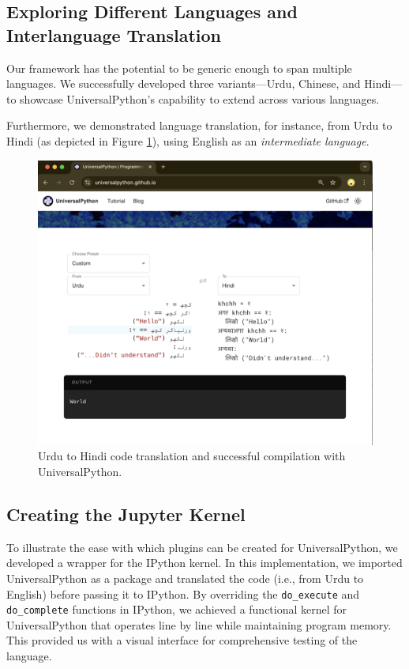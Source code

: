 \documentclass[conference]{IEEEtran}
\begin{document}
\subsection{Exploring Different Languages and Interlanguage Translation}

Our framework has the potential to be generic enough to span multiple languages. We successfully developed three variants—Urdu, Chinese, and Hindi—to showcase UniversalPython's capability to extend across various languages.

Furthermore, we demonstrated language translation, for instance, from Urdu to Hindi (as depicted in Figure \ref{fig:language-to-language}), using English as an \textit{intermediate language}.
\begin{figure}[htbp]
\centerline{\includegraphics[width=\columnwidth]{UniversalPython-language-to-language.png}}
\caption{Urdu to Hindi code translation and successful compilation with UniversalPython.}
\label{fig:language-to-language}
\end{figure}


\subsection{Creating the Jupyter Kernel}

To illustrate the ease with which plugins can be created for UniversalPython, we developed a wrapper for the IPython kernel. In this implementation, we imported UniversalPython as a package and translated the code (i.e., from Urdu to English) before passing it to IPython. By overriding the \verb|do_execute| and \verb|do_complete| functions in IPython, we achieved a functional kernel for UniversalPython that operates line by line while maintaining program memory. This provided us with a visual interface for comprehensive testing of the language.
\end{document}
